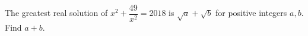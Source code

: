 The greatest real solution of $x^2+\dfrac{49}{x^2}=2018$ is $\sqrt a+\sqrt b$ for positive integers $a,b$. Find $a+b$.
